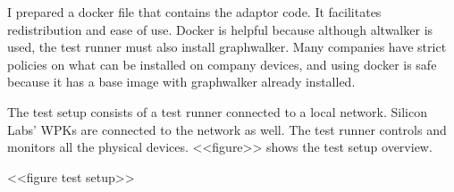 I prepared a docker file that contains the adaptor code. It facilitates redistribution and ease of use. Docker is helpful because although altwalker is used, the test runner must also install graphwalker. Many companies have strict policies on what can be installed on company devices, and using docker is safe because it has a base image with graphwalker already installed.

The test setup consists of a test runner connected to a local network. Silicon Labs' WPKs are connected to the network as well. The test runner controls and monitors all the physical devices. <<figure>> shows the test setup overview.

<<figure test setup>>